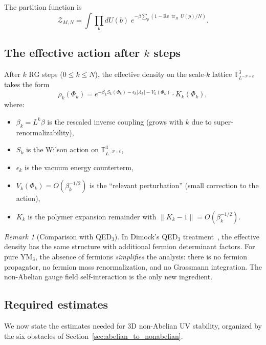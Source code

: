 \documentclass[11pt,a4paper]{article}
\theoremstyle{plain}
\theoremstyle{definition}
\theoremstyle{remark}
\newtheorem{remark}[theorem]{Remark}
\newcommand{\T}{\mathbb{T}}
\newcommand{\tr}{\operatorname{tr}}
\newcommand{\cZ}{\mathcal{Z}}
\begin{document}
The partition function is
\begin{equation}
  \cZ_{M,N} = \int \prod_b dU(b) \;
  e^{-\beta \sum_p (1 - \text{Re}\,\tr_R\,U(p)/N)}.
\end{equation}

\subsection{The effective action after $k$ steps}

After $k$ RG steps ($0 \le k \le N$), the effective
density on the scale-$k$ lattice $\T_{L^{-N+k}}^3$
takes the form
\begin{equation}\label{eq:effective_density_3d}
  \rho_k(\Phi_k) = e^{-\beta_k S_k(\Phi_k)
  - \epsilon_k |\Lambda_k| - V_k(\Phi_k)}
  \cdot K_k(\Phi_k),
\end{equation}
where:
\begin{itemize}[nosep]
  \item $\beta_k = L^k \beta$ is the rescaled inverse coupling
    (grows with $k$ due to super-renormalizability),
  \item $S_k$ is the Wilson action on $\T_{L^{-N+k}}^3$,
  \item $\epsilon_k$ is the vacuum energy counterterm,
  \item $V_k(\Phi_k) = O(\beta_k^{-1/2})$ is the
    ``relevant perturbation'' (small correction to the action),
  \item $K_k$ is the polymer expansion remainder
    with $\|K_k - 1\| = O(\beta_k^{-1/2})$.
\end{itemize}

\begin{remark}[Comparison with QED$_3$]
  In Dimock's QED$_3$ treatment~\cite{Dimock22},
  the effective density has the same structure
  with additional fermion determinant factors.
  For pure YM$_3$, the absence of fermions
  \emph{simplifies} the analysis: there is no
  fermion propagator, no fermion mass renormalization,
  and no Grassmann integration. The non-Abelian
  gauge field self-interaction is the only new ingredient.
\end{remark}

\subsection{Required estimates}

We now state the estimates needed for 3D non-Abelian
UV stability, organized by the six obstacles of
Section~\ref{sec:abelian_to_nonabelian}.
\end{document}
